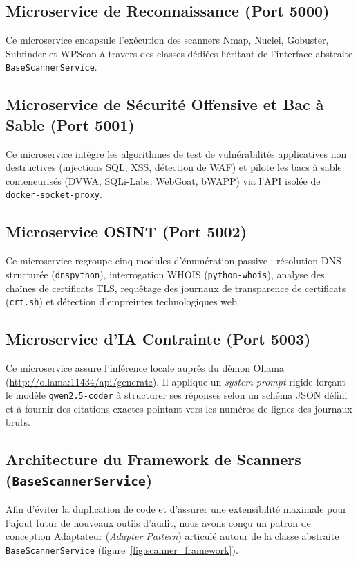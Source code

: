 \subsection{Microservice de Reconnaissance (Port 5000)}
\par Ce microservice encapsule l'ex\'ecution des scanners Nmap, Nuclei, Gobuster, Subfinder et WPScan \`a travers des classes d\'edi\'ees h\'eritant de l'interface abstraite \texttt{BaseScannerService}.

\subsection{Microservice de S\'ecurit\'e Offensive et Bac \`a Sable (Port 5001)}
\par Ce microservice int\`egre les algorithmes de test de vuln\'erabilit\'es applicatives non destructives (injections SQL, XSS, d\'etection de WAF) et pilote les bacs \`a sable conteneuris\'es (DVWA, SQLi-Labs, WebGoat, bWAPP) via l'API isol\'ee de \texttt{docker-socket-proxy}.

\subsection{Microservice OSINT (Port 5002)}
\par Ce microservice regroupe cinq modules d'\'enum\'eration passive : r\'esolution DNS structur\'ee (\texttt{dnspython}), interrogation WHOIS (\texttt{python-whois}), analyse des cha\^ines de certificats TLS, requ\^etage des journaux de transparence de certificats (\texttt{crt.sh}) et d\'etection d'empreintes technologiques web.

\subsection{Microservice d'IA Contrainte (Port 5003)}
\par Ce microservice assure l'inf\'erence locale aupr\`es du d\'emon Ollama (\url{http://ollama:11434/api/generate}). Il applique un \textit{system prompt} rigide for\c{c}ant le mod\`ele \texttt{qwen2.5-coder} \`a structurer ses r\'eponses selon un sch\'ema JSON d\'efini et \`a fournir des citations exactes pointant vers les num\'eros de lignes des journaux bruts.

\subsection{Architecture du Framework de Scanners (\texttt{BaseScannerService})}
\par Afin d'\'eviter la duplication de code et d'assurer une extensibilit\'e maximale pour l'ajout futur de nouveaux outils d'audit, nous avons con\c{c}u un patron de conception Adaptateur (\textit{Adapter Pattern}) articul\'e autour de la classe abstraite \texttt{BaseScannerService} (figure~\ref{fig:scanner_framework}).

